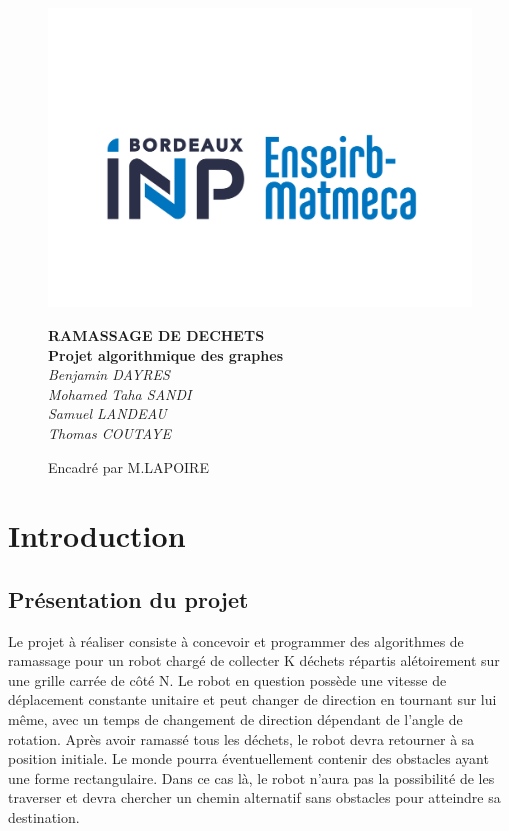 \documentclass{article}
\begin{document}
\begin{titlepage}
\begin{figure}[!h]
    \centerline{\includegraphics[scale=0.4]{Logo.png}}
    \centering
	\vspace{1cm}
    {\huge\bfseries RAMASSAGE DE DECHETS \\}
    {\huge\bfseries Projet algorithmique des graphes \\}
	\vspace{2cm}
	{\Large\itshape Benjamin DAYRES \\ Mohamed Taha SANDI \\ Samuel LANDEAU \\ Thomas COUTAYE \\}
	\vspace{1cm}
	{\large Encadr\'e par M.LAPOIRE\par}
    

\end{figure}
\end{titlepage}


\section{Introduction }
\subsection{Présentation du projet}
\hspace{0,5cm}  Le projet \`a  r\'ealiser consiste \`a concevoir et programmer des algorithmes de ramassage pour un robot charg\'e de collecter K d\'echets r\'epartis al\'etoirement
sur une grille carr\'ee de c\^ot\'e N. Le robot en question poss\`ede une vitesse de d\'eplacement constante unitaire et peut changer de direction en tournant sur lui m\^eme, avec un temps de changement
de direction d\'ependant de l'angle de rotation. Apr\`es avoir ramass\'e tous les d\'echets, le robot devra retourner \`a sa position initiale.
Le monde pourra \'eventuellement contenir des obstacles ayant une forme rectangulaire. Dans ce cas l\`a, le robot n'aura pas la possibilit\'e de les traverser et devra chercher un chemin alternatif
sans obstacles pour atteindre sa destination.
\end{document}
